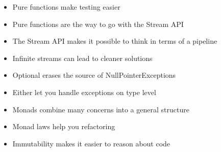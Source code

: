 \begin{itemize}[<+->]
\item Pure functions make testing easier
\item Pure functions are the way to go with the Stream API
\item The Stream API makes it possible to think in terms of a pipeline
\item Infinite streams can lead to cleaner solutions
\item Optional erases the source of NullPointerExceptions
\item Either let you handle exceptions on type level
\item Monads combine many concerns into a general structure
\item Monad laws help you refactoring
\item Immutability makes it easier to reason about code
\end{itemize}

